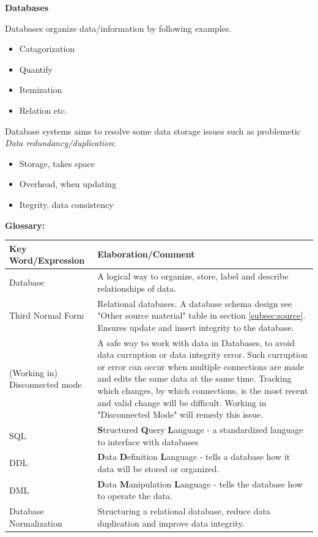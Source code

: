 {{\bfseries{Databases}}

Databases organize data/information by following examples.

\begin{itemize}
    \item Catagorization
    \item Quantify
    \item Itemization
    \item Relation etc.
\end{itemize}

Database systems aims to resolve some data storage issues such as problemetic {\emph{Data redundancy/duplication}}:
\begin{itemize}
    \item Storage, takes space
    \item Overhead, when updating
    \item Itegrity, data consistency
\end{itemize}

{\bfseries{Glossary:}}

\begin{tabular}{p{40mm} | p{120mm}}
    {\bfseries{Key Word/Expression}} & {\bfseries{Elaboration/Comment}}\\ \hline
    Database & A logical way to organize, store, label and describe relationships of data.\\ \hline
    Third Normal Form & Relational databases. A database schema design see "Other source material" table in section \ref{subsec:source}. Ensures update and insert integrity to the database.\\ \hline
    (Working in) Disconnected mode & A safe way to work with data in Databases, to avoid data curruption or data integrity error. Such curruption or error can occur when multiple connections are made and edits the same data at the same time. Tracking which changes, by which connections, is the most recent and valid change will be difficult. Working in "Disconnected Mode" will remedy this issue.\\ \hline
    SQL & {\bfseries{S}}tructured {\bfseries{Q}}uery {\bfseries{L}}anguage - a standardized language to interface with databases\\ \hline
    DDL & {\bfseries{D}}ata {\bfseries{D}}efinition {\bfseries{L}}anguage - tells a database how it data will be stored or organized. \\ \hline
    DML & {\bfseries{D}}ata {\bfseries{M}}anipulation {\bfseries{L}}anguage - tells the database how to operate the data. \\ \hline
    Database Normalization & Structuring a relational database, reduce data duplication and improve data integrity. \\ \hline
\end{tabular}

}
